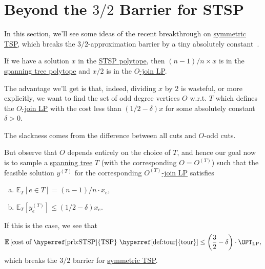 \section{Beyond the \(3 / 2\) Barrier for STSP}
In this section, we'll see some ideas of the recent breakthrough on \hyperref[prb:STSP]{symmetric TSP}, which breaks the \(3 / 2\)-approximation barrier by a tiny absolutely constant~\cite{10.1145/3406325.3451009}.
\begin{prev}
	If we have a solution \(x\) in the \hyperref[eq:STSP-polytope]{STSP polytope}, then \((n-1) / n \times x\) is in the \hyperref[eq:spanning-tree-polytope]{spanning tree polytope} and \(x / 2\) is in the \hyperref[eq:O-join-LP]{\(O\)-join LP}.
\end{prev}

The advantage we'll get is that, indeed, dividing \(x\) by \(2\) is wasteful, or more explicitly, we want to find the set of odd degree vertices \(O\) w.r.t. \(T\) which defines the \hyperref[eq:O-join-LP]{\(O\)-join LP} with the cost less than \((1 / 2 - \delta )x\) for some absolutely constant \(\delta > 0\).

\begin{intuition}
	The slackness comes from the difference between all cuts and \(O\)-odd cuts.
\end{intuition}

But observe that \(O\) depends entirely on the choice of \(T\), and hence our goal now is to sample a \hyperref[def:spanning-tree]{spanning tree} \(T\) (with the corresponding \(O = O^{(T)}\)) such that the feasible solution \(y^{(T)}\) for the corresponding \hyperref[eq:O-join-LP]{\(O^{(T)}\)-join LP} satisfies
\begin{enumerate}[(a)]
	\item \(\mathbb{E}_{T}\left[e\in T \right] = (n-1) / n \cdot x_e\),
	\item \(\mathbb{E}_{T}\left[y^{(T)}_e \right] \leq (1 / 2 - \delta )x_e\).
\end{enumerate}
If this is the case, we see that
\[
	\mathbb{E}\left[ \text{cost of \hyperref[prb:STSP]{TSP} \hyperref[def:tour]{tour}} \right] \leq \left( \frac{3}{2} - \delta  \right) \cdot \OPT_{\mathrm{LP}},
\]
which breaks the \(3 / 2\) barrier for \hyperref[prb:STSP]{symmetric TSP}.

